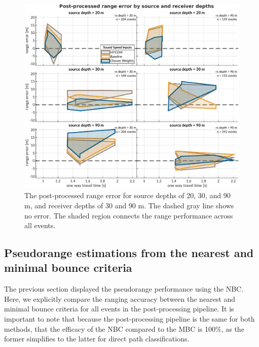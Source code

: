 \begin{figure}[!ht]
\includegraphics[width=\textwidth]{figs/Fig6.pdf}
\caption{The post-processed range error for source depths of 20, 30, and 90 m, and receiver depths of 30 and 90 m. The dashed gray line shows no error. The shaded region connects the range performance across all events.}
\label{fig:rangeError}
\end{figure}

\FloatBarrier
\subsection{Pseudorange estimations from the nearest and minimal bounce criteria}

The previous section displayed the pseudorange performance using the NBC.
Here, we explicitly compare the ranging accuracy between the nearest and minimal bounce criteria for all events in the post-processing pipeline.
It is important to note that because the post-processing pipeline is the same for both methods, that the efficacy of the NBC compared to the MBC is 100\%, as the former simplifies to the latter for direct path classifications.

